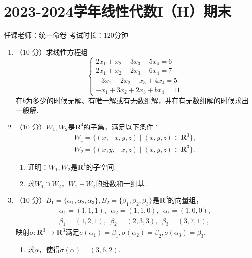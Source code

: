 \section{2023-2024学年线性代数I（H）期末}

\begin{center}
    任课老师：统一命卷\hspace{4em} 考试时长：120分钟
\end{center}

\begin{enumerate}
    \item （10 分）求线性方程组
    \[ \begin{cases}
        2x_1+x_2-3x_3-5x_4=6 \\
        2x_1+x_2-2x_3-6x_4=7 \\
        -3x_1+2x_2+x_3+4x_4=5 \\
        -x_1+3x_2+2x_3+bx_4=11
    \end{cases} \]
    在\(b\)为多少的时候无解、有唯一解或有无数组解，并在有无数组解的时候求出一般解.

    \item （10 分）\(W_1,W_2\)是\(\mathbf{R}^4\)的子集，满足以下条件：
    \begin{gather*}
        W_1=\{(x,-x,y,z)\mid(x,y,z)\in\mathbf{R}^3\}, \\
        W_2=\{(x,y,-x,z)\mid(x,y,z)\in\mathbf{R}^3\}.
    \end{gather*}

    \begin{enumerate}
        \item 证明：\(W_1,W_2\)是\(\mathbf{R}^4\)的子空间.

        \item 求\(W_1\cap W_2\)，\(W_1+W_2\)的维数和一组基.
    \end{enumerate}

    \item （10 分）\(B_1=\{\alpha_1,\alpha_2,\alpha_3\},B_2=\{\beta_1,\beta_2,\beta_3\}\)是\(\mathbf{R}^3\)的向量组，
    \begin{gather*}
        \alpha_1=(1,1,1),\enspace\alpha_2=(1,1,0),\enspace\alpha_3=(1,0,0), \\
        \beta_1=(1,2,1),\enspace\beta_2=(2,3,3),\enspace\beta_3=(3,7,1),
    \end{gather*}
    映射\(\sigma\colon\mathbf{R}^3\to\mathbf{R}^3\)满足\(\sigma(\alpha_1)=\beta_1,\sigma(\alpha_2)=\beta_2,\sigma(\alpha_3)=\beta_3\).
    \begin{enumerate}
        \item 求\(\alpha\)，使得\(\sigma(\alpha)=(3,6,2)\).


\end{enumerate}
\end{enumerate}
